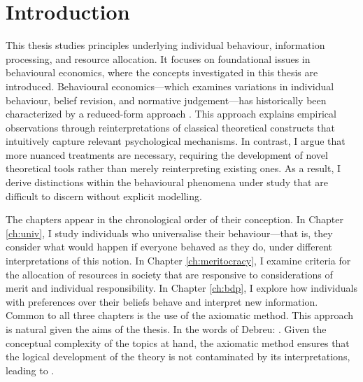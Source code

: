 \chapter{Introduction}\label{ch:intro}

This thesis studies principles underlying individual behaviour, information processing, and resource allocation. It focuses on foundational issues in behavioural economics, where the concepts investigated in this thesis are introduced. Behavioural economics—which examines variations in individual behaviour, belief revision, and normative judgement—has historically been characterized by a reduced-form approach \citep{spieglerBehavioralEconomicsAtheoretical2019}. This approach explains empirical observations through reinterpretations of classical theoretical constructs that intuitively capture relevant psychological mechanisms. In contrast, I argue that more nuanced treatments are necessary, requiring the development of novel theoretical tools rather than merely reinterpreting existing ones. As a result, I derive distinctions within the behavioural phenomena under study that are difficult to discern without explicit modelling.

The chapters appear in the chronological order of their conception. In Chapter \ref{ch:univ}, I study individuals who universalise their behaviour—that is, they consider what would happen if everyone behaved as they do, under different interpretations of this notion. In Chapter \ref{ch:meritocracy}, I examine criteria for the allocation of resources in society that are responsive to considerations of merit and individual responsibility. In Chapter \ref{ch:bdp}, I explore how individuals with preferences over their beliefs behave and interpret new information. Common to all three chapters is the use of the axiomatic method. This approach is natural given the aims of the thesis. In the words of Debreu:  \citep[p. x]{debreuTheoryValueAxiomatic1959}. Given the conceptual complexity of the topics at hand, the axiomatic method ensures that the logical development of the theory is not contaminated by its interpretations, leading to  \citep[p. x]{debreuTheoryValueAxiomatic1959}.

